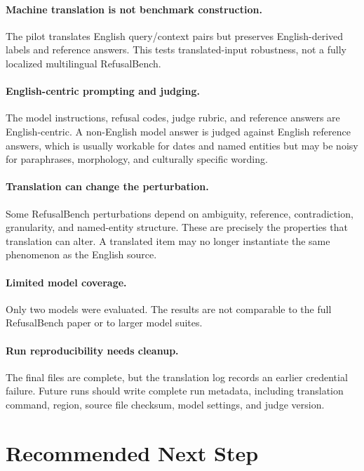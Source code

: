 \documentclass[11pt]{article}
\begin{document}
\paragraph{Machine translation is not benchmark construction.}
The pilot translates English query/context pairs but preserves English-derived
labels and reference answers. This tests translated-input robustness, not a
fully localized multilingual RefusalBench.

\paragraph{English-centric prompting and judging.}
The model instructions, refusal codes, judge rubric, and reference answers are
English-centric. A non-English model answer is judged against English reference
answers, which is usually workable for dates and named entities but may be noisy
for paraphrases, morphology, and culturally specific wording.

\paragraph{Translation can change the perturbation.}
Some RefusalBench perturbations depend on ambiguity, reference, contradiction,
granularity, and named-entity structure. These are precisely the properties that
translation can alter. A translated item may no longer instantiate the same
phenomenon as the English source.

\paragraph{Limited model coverage.}
Only two models were evaluated. The results are not comparable to the full
RefusalBench paper or to larger model suites.

\paragraph{Run reproducibility needs cleanup.}
The final files are complete, but the translation log records an earlier
credential failure. Future runs should write complete run metadata, including
translation command, region, source file checksum, model settings, and judge
version.

\section{Recommended Next Step}
\end{document}
